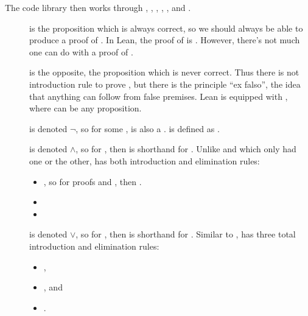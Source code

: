 The code library then works through , , , 
, , and .
\begin{description}
    \item[] is the proposition which is always correct, 
    so we should always be able to produce a proof of . In Lean,
    the proof of  is . However, there's 
    not much one can do with a proof of .
    \item[] is the opposite, the proposition which is 
    never correct. Thus there is not introduction rule to prove , 
    but there is the principle ``ex falso'', the idea that anything can 
    follow from false premises. Lean is equipped with ,
    where  can be any proposition. 
    \item[] is denoted $\lnot$, so for
    some ,  is also a . 
     is defined as .
    \item[] is denoted $\wedge$, so 
    for , then  is shorthand for 
    . Unlike  and  which only 
    had one or the other,  has both introduction and elimination
    rules: \begin{itemize}
        \item {}, so for
        proofs  and , then 
        .
        \item {}
        \item {} 
    \end{itemize}
    \item[] is denoted $\vee$, so 
    for , then  is shorthand for 
    . Similar to ,  has three total 
    introduction and elimination rules: \begin{itemize}
        \item {},
        \item {}, and
        \item {}.

\end{itemize}
\end{description}
